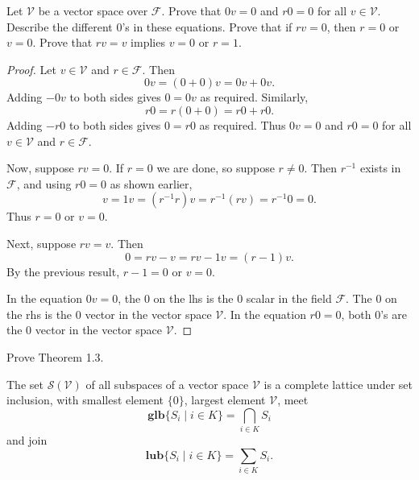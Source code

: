 \begin{tcolorbox}[title=Problem 1, breakable]
    Let $\mathcal{V}$ be a vector space over $\mathcal{F}$.
    Prove that $0v = 0$ and $r0 = 0$ for all $v \in \mathcal{V}$.
    Describe the different $0$'s in these equations. Prove that if 
    $rv = 0$, then $r = 0$ or $v = 0$. Prove that $rv = v$ implies $v = 0$ or $r = 1$.
\end{tcolorbox}

\begin{proof}
    Let $v \in \mathcal{V}$ and $r \in \mathcal{F}$.
    Then 
    \[0v = (0 + 0)v = 0v + 0v.\]
    Adding $-0v$ to both sides gives $0 = 0v$ as required.
    Similarly,
    \[r0 = r(0 + 0) = r0 + r0.\]
    Adding $-r0$ to both sides gives $0 = r0$ as required.
    Thus $0v = 0$ and $r0 = 0$ for all $v \in \mathcal{V}$ and $r \in \mathcal{F}$.

    Now, suppose $rv = 0$. 
    If $r = 0$ we are done, so suppose $r \ne 0$.
    Then $r^{-1}$ exists in $\mathcal{F}$, and using $r0 = 0$ as shown earlier,
    \[v = 1v = (r^{-1}r)v = r^{-1}(rv) = r^{-1}0 = 0.\]
    Thus $r = 0$ or $v = 0$.

    Next, suppose $rv = v$. Then
    \[0 = rv - v = rv - 1v = (r - 1)v.\]
    By the previous result, $r - 1 = 0$ or $v = 0$.

    In the equation $0v = 0$, the $0$ on the lhs is the $0$ scalar in the field $\mathcal{F}$.
    The $0$ on the rhs is the $0$ vector in the vector space $\mathcal{V}$.
    In the equation $r0 = 0$, both $0$'s are the $0$ vector in the vector space $\mathcal{V}$.
\end{proof}

\begin{tcolorbox}[title=Problem 2, breakable]
    Prove Theorem 1.3.
\end{tcolorbox}

\begin{theorem}[Theorem 1.3]
    The set $\mathcal{S}(\mathcal{V})$ of all subspaces of a vector space $\mathcal{V}$ is 
        a complete lattice under set inclusion, with smallest element $\{0\}$, largest 
        element $\mathcal{V}$, meet
    \[\textbf{glb}\{S_i \mid i \in K\} = \bigcap_{i \in K} S_i\]
    and join 
    \[\textbf{lub}\{S_i \mid i \in K\} = \sum_{i \in K} S_i.\]
\end{theorem}

